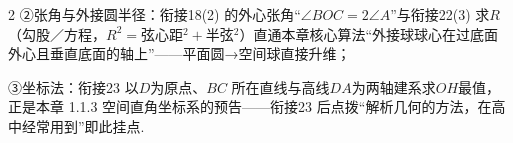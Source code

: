 \documentclass[fontset=none]{ctexart}
\begin{document}
\begin{multicols}{2}
\bindp ②张角与外接圆半径：衔接18(2) 的外心张角“\(\angle BOC=2\angle A\)”与衔接22(3) 求\(R\)（勾股／方程，\(R^{2}=\)弦心距\({}^{2}+\)半弦\({}^{2}\)）直通本章核心算法“外接球球心在过底面外心且垂直底面的轴上”——平面圆→空间球直接升维；

\bindp ③坐标法：衔接23 以\(D\)为原点、\(BC\) 所在直线与高线\(DA\)为两轴建系求\(OH\)最值，正是本章 1.1.3 空间直角坐标系的预告——衔接23 后点拨“解析几何的方法，在高中经常用到”即此挂点.\par\addvspace{0.80mm}

\end{multicols}
\end{document}
